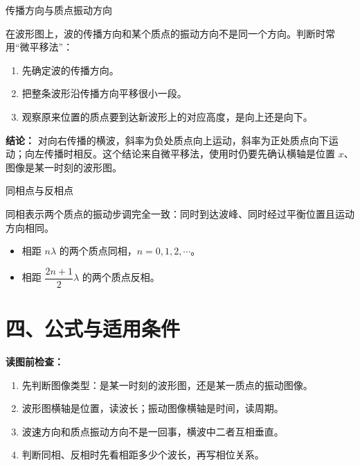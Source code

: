 \begin{conceptbox}{传播方向与质点振动方向}

在波形图上，波的传播方向和某个质点的振动方向不是同一个方向。判断时常用“微平移法”：

\begin{center}


\label{fig:wave-direction-shift}
\end{center}

\begin{enumerate}
  \item 先确定波的传播方向。
  \item 把整条波形沿传播方向平移很小一段。
  \item 观察原来位置的质点要到达新波形上的对应高度，是向上还是向下。
\end{enumerate}

\textbf{结论：} 对向右传播的横波，斜率为负处质点向上运动，斜率为正处质点向下运动；向左传播时相反。这个结论来自微平移法，使用时仍要先确认横轴是位置 $x$、图像是某一时刻的波形图。

\end{conceptbox}

\begin{conceptbox}{同相点与反相点}

同相表示两个质点的振动步调完全一致：同时到达波峰、同时经过平衡位置且运动方向相同。

\begin{center}


\label{fig:wave-phase-points}
\end{center}

\begin{itemize}
  \item 相距 $n\lambda$ 的两个质点同相，$n=0,1,2,\cdots$。
  \item 相距 $\dfrac{2n+1}{2}\lambda$ 的两个质点反相。
\end{itemize}

\end{conceptbox}

\section*{四、公式与适用条件}

\textbf{读图前检查：}
\begin{enumerate}
  \item 先判断图像类型：是某一时刻的波形图，还是某一质点的振动图像。
  \item 波形图横轴是位置，读波长；振动图像横轴是时间，读周期。
  \item 波速方向和质点振动方向不是一回事，横波中二者互相垂直。
  \item 判断同相、反相时先看相距多少个波长，再写相位关系。
\end{enumerate}


